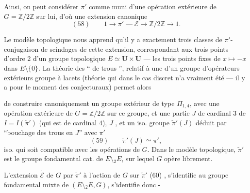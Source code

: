 Ainsi, on peut considérer $\pi'$ comme muni 
d'une  opération extérieure de
$G=\mathbb Z/2\mathbb Z$ sur lui, d'où une extension
canonique
\[
(58)\qquad 1\longrightarrow\pi'\mathrel{\text{---}}\mathcal E\longrightarrow\mathbb Z/2\mathbb Z\longrightarrow1.
\]

Le modèle topologique nous apprend
qu'il y a exactement trois classes de $\pi'$-
conjugaison de scindages de cette
extension, correspondant aux trois
points d'ordre $2$ d'un groupe topologique
$E\simeq\mathbf U\times\mathbf U$ --- les trois points fixes de
$x\mapsto-x$ dans $E\setminus\{0\}$. La théorie des
`` de trous '', relatif à une
 d'un groupe  d'opérateurs extérieurs
 groupe à lacets (théorie qui
 dans le cas discret n'a vraiment
été  --- il y a pour le moment des
 conjecturaux) permet alors


de construire canoniquement un groupe extérieur  de type $\Pi_{1,4}$, avec une opération extérieure de $G=\mathbb Z/2\mathbb Z$ sur ce groupe, et une partie $J$  de cardinal $3$ de $I=I(\widetilde{\pi}')$ (qui est de cardinal $4$), $J$ , et un iso.  groupe $\widetilde{\pi}'(J)$  déduit par ``bouchage des trous en $J$'' avec $\pi'$
\[
(59)\qquad \widetilde{\pi}'(J)\simeq\pi',
\]
iso. qui soit compatible avec les opérations de $G$. Dans le modèle topologique, $\widetilde{\pi}'$ est le groupe fondamental cat. de  $E\setminus {}_2E$,  sur lequel $G$ opère librement.


L'extension $\widetilde{\mathcal E}$ de $G$ par $\widetilde{\pi}'$  à l'action de  $G$ sur $\widetilde{\pi}'$
\noindent (60)\quad
{},
 s'identifie  au groupe fondamental mixte de $(E\setminus {}_2E,G)$, s'identifie donc -

